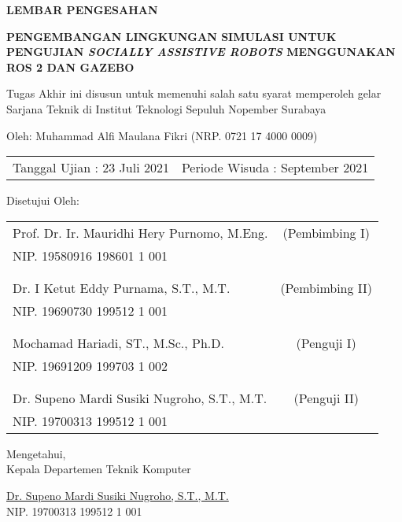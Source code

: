 \begin{center}
	\large
  \textbf{LEMBAR PENGESAHAN}
\end{center}

\thispagestyle{empty}

\begin{center}
  \small

  \textbf{PENGEMBANGAN LINGKUNGAN SIMULASI UNTUK PENGUJIAN \emph{SOCIALLY ASSISTIVE ROBOTS} MENGGUNAKAN ROS 2 DAN GAZEBO}
\end{center}

\begingroup
  \small

  \begin{center}
    Tugas Akhir ini disusun untuk memenuhi salah satu syarat memperoleh gelar Sarjana Teknik di Institut Teknologi Sepuluh Nopember Surabaya
  \end{center}

  \begin{center}
    Oleh: Muhammad Alfi Maulana Fikri (NRP. 0721 17 4000 0009)
  \end{center}

  \begingroup
    \setlength{\tabcolsep}{0pt}
    \noindent
    \begin{tabularx}{\textwidth}{X r}
    Tanggal Ujian : 23 Juli 2021 & Periode Wisuda : September 2021
    \end{tabularx}
  \endgroup

  \begin{center}
    Disetujui Oleh:
  \end{center}

  \begingroup
    \setlength{\tabcolsep}{0pt}
    \noindent
    \begin{tabularx}{\textwidth}{X c}
      Prof. Dr. Ir. Mauridhi Hery Purnomo, M.Eng. & (Pembimbing I) \\
      NIP. 19580916 198601 1 001                  & \\
      & \\
      & \\
      Dr. I Ketut Eddy Purnama, S.T., M.T.        & (Pembimbing II) \\
      NIP. 19690730 199512 1 001                  & \\
      & \\
      & \\
      Mochamad Hariadi, ST., M.Sc., Ph.D.         & (Penguji I) \\
      NIP. 19691209 199703 1 002                  & \\
      & \\
      & \\
      Dr. Supeno Mardi Susiki Nugroho, S.T., M.T. & (Penguji II) \\
      NIP. 19700313 199512 1 001                  & \\
    \end{tabularx}
  \endgroup

  \vspace{4ex}

  \begin{center}
    Mengetahui, \\
    Kepala Departemen Teknik Komputer \\

    \vspace{8ex}

    \underline{Dr. Supeno Mardi Susiki Nugroho, S.T., M.T.} \\
    NIP. 19700313 199512 1 001
  \end{center}
\endgroup
